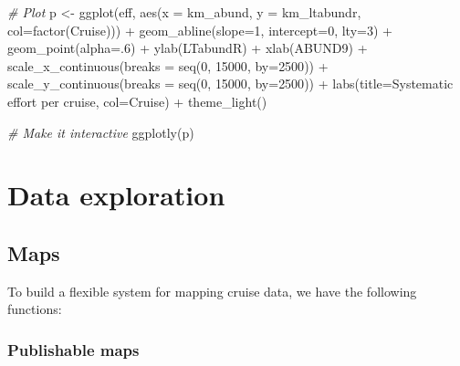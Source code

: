 \documentclass[
]{book}
\newenvironment{Shaded}{\begin{snugshade}}{\end{snugshade}}
\newcommand{\AttributeTok}[1]{\textcolor[rgb]{0.77,0.63,0.00}{#1}}
\newcommand{\CommentTok}[1]{\textcolor[rgb]{0.56,0.35,0.01}{\textit{#1}}}
\newcommand{\DecValTok}[1]{\textcolor[rgb]{0.00,0.00,0.81}{#1}}
\newcommand{\FunctionTok}[1]{\textcolor[rgb]{0.00,0.00,0.00}{#1}}
\newcommand{\NormalTok}[1]{#1}
\newcommand{\OtherTok}[1]{\textcolor[rgb]{0.56,0.35,0.01}{#1}}
\newcommand{\SpecialCharTok}[1]{\textcolor[rgb]{0.00,0.00,0.00}{#1}}
\newcommand{\StringTok}[1]{\textcolor[rgb]{0.31,0.60,0.02}{#1}}
\begin{document}
\begin{Shaded}
\begin{Highlighting}[]
\CommentTok{\# Plot}
\NormalTok{p }\OtherTok{\textless{}{-}} 
  \FunctionTok{ggplot}\NormalTok{(eff, }\FunctionTok{aes}\NormalTok{(}\AttributeTok{x =}\NormalTok{ km\_abund, }\AttributeTok{y =}\NormalTok{ km\_ltabundr, }\AttributeTok{col=}\FunctionTok{factor}\NormalTok{(Cruise))) }\SpecialCharTok{+}
  \FunctionTok{geom\_abline}\NormalTok{(}\AttributeTok{slope=}\DecValTok{1}\NormalTok{, }\AttributeTok{intercept=}\DecValTok{0}\NormalTok{, }\AttributeTok{lty=}\DecValTok{3}\NormalTok{) }\SpecialCharTok{+} 
  \FunctionTok{geom\_point}\NormalTok{(}\AttributeTok{alpha=}\NormalTok{.}\DecValTok{6}\NormalTok{) }\SpecialCharTok{+} 
  \FunctionTok{ylab}\NormalTok{(}\StringTok{\textquotesingle{}LTabundR\textquotesingle{}}\NormalTok{) }\SpecialCharTok{+} \FunctionTok{xlab}\NormalTok{(}\StringTok{\textquotesingle{}ABUND9\textquotesingle{}}\NormalTok{) }\SpecialCharTok{+} 
  \FunctionTok{scale\_x\_continuous}\NormalTok{(}\AttributeTok{breaks =} \FunctionTok{seq}\NormalTok{(}\DecValTok{0}\NormalTok{, }\DecValTok{15000}\NormalTok{, }\AttributeTok{by=}\DecValTok{2500}\NormalTok{)) }\SpecialCharTok{+} 
  \FunctionTok{scale\_y\_continuous}\NormalTok{(}\AttributeTok{breaks =} \FunctionTok{seq}\NormalTok{(}\DecValTok{0}\NormalTok{, }\DecValTok{15000}\NormalTok{, }\AttributeTok{by=}\DecValTok{2500}\NormalTok{)) }\SpecialCharTok{+} 
  \FunctionTok{labs}\NormalTok{(}\AttributeTok{title=}\StringTok{\textquotesingle{}Systematic effort per cruise\textquotesingle{}}\NormalTok{, }\AttributeTok{col=}\StringTok{\textquotesingle{}Cruise\textquotesingle{}}\NormalTok{) }\SpecialCharTok{+} 
  \FunctionTok{theme\_light}\NormalTok{()}

\CommentTok{\# Make it interactive}
\FunctionTok{ggplotly}\NormalTok{(p)}
\end{Highlighting}
\end{Shaded}

\hypertarget{part-data-exploration}{%
\part{Data exploration}\label{part-data-exploration}}

\hypertarget{maps}{%
\chapter{Maps}\label{maps}}

To build a flexible system for mapping cruise data, we have the following functions:

\hypertarget{publishable-maps}{%
\section*{Publishable maps}\label{publishable-maps}}
\end{document}
